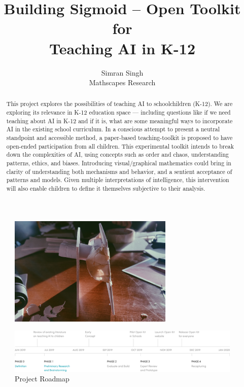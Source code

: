 \documentclass	[a4paper,11pt, hidelinks]{article}
\date			{\displaydate{date}}
\title{Building Sigmoid -- Open Toolkit for\\Teaching AI in K-12}
\author{ 
	Simran Singh\\
	\small{Mathscapes Research}\\
}
\theoremstyle{definition}
\begin{document}
\maketitle
\thispagestyle{fancy}

\begin{figure}[h]
  \center
  \includegraphics[width=0.7\textwidth]{papertool4.jpg}
\end{figure}

\begin{abstract}
	 This project explores the possibilities of teaching AI to schoolchildren (K-12). We are exploring its relevance in K-12 education space — including questions like if we need teaching about AI in K-12 and if it is, what are some meaningful ways to incorporate AI in the existing school curriculum. In a conscious attempt to present a neutral standpoint and accessible method, a paper-based teaching-toolkit is proposed to have open-ended participation from all children. This experimental toolkit intends to break down the complexities of AI, using concepts such as order and chaos, understanding patterns, ethics, and biases. Introducing visual/graphical mathematics could bring in clarity of understanding both mechanisms and behavior, and a sentient acceptance of patterns and models. Given multiple interpretations of intelligence, this intervention will also enable children to define it themselves subjective to their analysis.
\end{abstract}

\begin{figure}[h]
  \center
  \includegraphics[width=\textwidth]{sigmoid_roadmap.png}
  \caption{Project Roadmap}
\end{figure}
\end{document}
